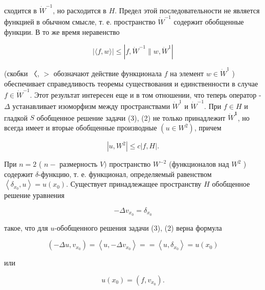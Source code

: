 \documentclass[10pt]{article}
\begin{document}
сходится в $\dot{W}^{-1}$, но расходится в $H$. Предел этой последовательности не является функцией в обычном смысле, т. е. пространство $\dot{W}^{-1}$ содержит обобщенные функции. В то же время неравенство



\[

|\langle f, w\rangle| \leqslant\left|f, \dot{W}^{-1} \| w, \dot{W}^{1}\right|

\]



(скобки 〈, $>$ обозначают действие функционала $f$ на элемент $w \in \dot{W}^{1}$ ) обеспечивает справедливость теоремы существования и единственности в случае $f \in \dot{W}^{-1}$. Этот результат интересен еще и в том отношении, что теперь оператор - $\Delta$ устанавливает изоморфизм между пространствами $\dot{W}^{1}$ и $\dot{W}^{-1}$. При $f \in H$ и гладкой $S$ обобщенное решение задачи (3), (2) не только принадлежит $\dot{W}^{\mathbf{1}}$, но всегда имеет и вторые обобщенные производные $\left(u \in W^{2}\right)$, причем



\[

\left|u, W^{2}\right| \leqslant c|f, H| .

\]



При $n=2$ ( $n-$ размерность $V)$ пространство $W^{-2}$ (функционалов над $W^{2}$ ) содержит $\delta$-функцию, т. е. функционал, определяемый равенством $\left\langle\delta_{x_{0}}, u\right\rangle=u\left(x_{0}\right)$. Существует принадлежащее пространству $H$ обобщенное решение уравнения



\[

-\Delta v_{x_{0}}=\delta_{x_{0}}

\]



такое, что для $u$-обобщенного решения задачи (3), (2) верна формула



\[

\left(-\Delta u, v_{x_{0}}\right)=\left\langle u,-\Delta v_{x_{0}}\right\rangle==\left\langle u, \delta_{x_{0}}\right\rangle=u\left(x_{0}\right)

\]



или



\[

u\left(x_{0}\right)=\left(f, v_{x_{0}}\right) .

\]
\end{document}
